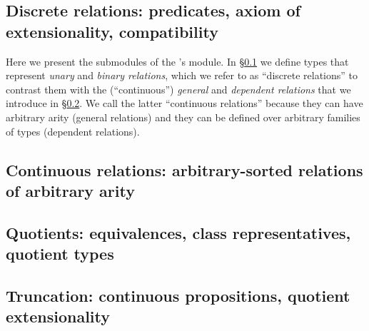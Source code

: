 \documentclass[a4paper,UKenglish,cleveref,autoref,thm-restate,12pt]{../lipics-v2021-wjd}
\begin{document}
\subsection{Discrete relations: predicates, axiom of extensionality, compatibility}\label{sec:discrete-relations}
Here we present the submodules of the \agdaualib's  module. In \S\ref{sec:discrete-relations} we define types that represent \emph{unary} and \emph{binary relations}, which we refer to as ``discrete relations'' to contrast them with the (``continuous'') \emph{general} and \emph{dependent relations} that we introduce in \S\ref{sec:continuous-relations}. We call the latter ``continuous relations'' because they can have arbitrary arity (general relations) and they can be defined over arbitrary families of types (dependent relations).



\subsection{Continuous relations: arbitrary-sorted relations of arbitrary arity}\label{sec:continuous-relations}


\subsection{Quotients: equivalences, class representatives, quotient types}\label{sec:equiv-relat-quot}


\subsection{Truncation: continuous propositions, quotient extensionality}\label{sec:trunc-sets-prop}

\end{document}
